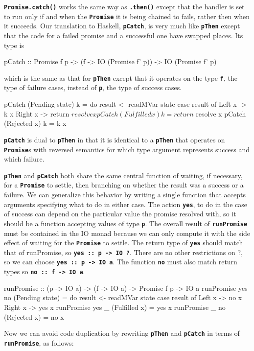 \documentclass[12pt, english, letterpaper]{kuthesis}
\newcommand{\lit}[1]{\textbf{\texttt{#1}}}
\begin{document}
 \lit{Promise.catch()} works the same way as \lit{.then()} except that the handler is set to run only if and when the \lit{Promise} it is being chained to fails, rather then when it succeeds.  Our translation to Haskell, \lit{pCatch}, is very much like \lit{pThen} except that the code for a failed promise and a successful one have swapped places.  Its type is
 \begin{code}
pCatch :: Promise f p
        -> (f -> IO (Promise f' p))
        -> IO (Promise f' p)
\end{code}
which is the same as that for \lit{pThen} except that it operates on the type \lit f, the type of failure cases, instead of \lit p, the type of success cases.
\begin{code}
pCatch (Pending state) k = do
  result <- readMVar state
  case result of
    Left x -> k x
    Right x -> return $ resolve x
pCatch (Fulfilled x) k = return $ resolve x
pCatch (Rejected x) k = k x
\end{code}
\lit{pCatch} is dual to \lit{pThen} in that it is identical to a \lit{pThen} that operates on \lit{Promise}s with reversed semantics for which type argument represents success and which failure.

\lit{pThen} and \lit{pCatch} both share the same central function of waiting, if necessary, for a \lit{Promise} to settle, then branching on whether the result was a success or a failure.  We can generalize this behavior by writing a single function that accepts arguments specifying what to do in either case.  The action \lit{yes}, to do in the case of success can depend on the particular value the promise resolved with, so it should be a function accepting values of type \lit p.  The overall result of \lit{runPromise} must be contained in the IO monad because we can only compute it with the side effect of waiting for the \lit{Promise} to settle.  The return type of \lit{yes} should match that of runPromise, so \lit{yes ::\ p -> IO ?}.  There are no other restrictions on ?, so we can choose \lit{yes ::\ p -> IO a}. The function \lit{no} must also match return types so \lit{no ::\ f -> IO a}.

\begin{code}
runPromise :: (p -> IO a) -> (f -> IO a) -> Promise f p -> IO a
runPromise yes no (Pending state) = do
  result <- readMVar state
  case result of
    Left x -> no x
    Right x -> yes x
runPromise yes _ (Fulfilled x) = yes x
runPromise _ no (Rejected x) = no x
\end{code}
Now we can avoid code duplication by rewriting \lit{pThen} and \lit{pCatch} in terms of \lit{runPromise}, as follows:
\end{document}
